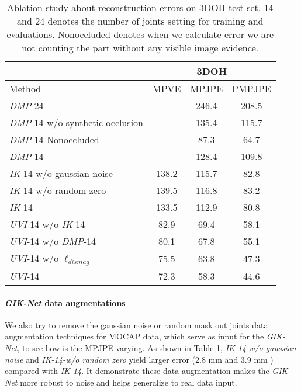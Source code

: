 \documentclass[10pt,twocolumn,letterpaper]{article}
\begin{document}
\begin{table}
\begin{center}
\small
\begin{tabular}{l |c|c|c }
\hline
        &  \multicolumn{3}{c}{3DOH}  \\
\hline
Method  &  MPVE & MPJPE & PMPJPE  \\
\hline
\textit{DMP}-24    & -  & 246.4   & 208.5  \\
\textit{DMP}-14  w/o synthetic occlusion  & -  &  135.4 & 115.7 \\
\textit{DMP}-14-Nonoccluded    & -  &  87.3 & 64.7 \\
\textit{DMP}-14    & -  &  128.4 & 109.8 \\
\hline


\textit{IK}-14 w/o gaussian noise    & 138.2  &  115.7  & 82.8 \\
\textit{IK}-14 w/o random zero    & 139.5  &  116.8  & 83.2 \\
\textit{IK}-14     & 133.5  &  112.9  & 80.8 \\
\hline
\textit{UVI}-14  w/o \textit{IK}-14   &   82.9 &  69.4 & 58.1  \\
\textit{UVI}-14  w/o \textit{DMP}-14   &   80.1  &   67.8 &  55.1  \\
\textit{UVI}-14  w/o $\ell_{dismag}$   & 75.5   &  63.8  &  47.3 \\
\textit{UVI}-14     &  72.3  & 58.3   & 44.6  \\
\hline
\end{tabular}
\end{center}
\caption{Ablation study about reconstruction errors on 3DOH test set. 14 and 24 denotes the number of joints setting for training and evaluations. Nonoccluded denotes when we calculate error we are not counting the part without any visible image evidence.}
\label{table:3dohablstions}
\end{table}

\paragraph{\textit{GIK-Net} data augmentations} We also try to remove the gaussian noise or random mask out joints data augmentation techniques for MOCAP data, which serve as input for the \textit{GIK-Net}, to see how is the MPJPE varying. 
As shown in Table \ref{table:3dohablstions}, \textit{IK-14 w/o gaussian noise} and \textit{IK-14-w/o random zero} yield larger error (2.8 mm and 3.9 mm ) compared with \textit{IK-14}. It demonstrate these data augmentation makes the \textit{GIK-Net} more robust to noise and helps generalize to real data input.  
\end{document}
